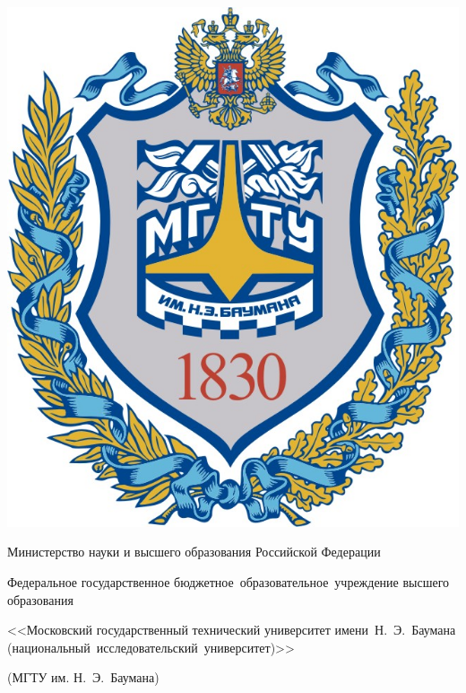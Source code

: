 \begin{titlepage}
	\begin{center}
		\fontsize{12pt}{12pt}\selectfont
		
		\fbox
		{
			\begin{minipage}{0.15\textwidth}
				\includegraphics[width=\linewidth]{./assets/img/bmstu.png}
			\end{minipage}
			\hfill
			
			\vrule
			\hspace{0.2cm}
			
			\begin{minipage}{0.80\textwidth}\centering\bfseries
				{
					\linespread{1}\selectfont
					{Министерство науки и высшего образования Российской Федерации}
					
					{Федеральное государственное бюджетное~образовательное~учреждение высшего образования}
					
					{<<Московский государственный технический университет имени~Н.~Э.~Баумана (национальный~исследовательский~университет)>>}
					
					{(МГТУ им. Н.~Э.~Баумана)}
				}
			\end{minipage}
		}
		

\end{center}
\end{titlepage}
